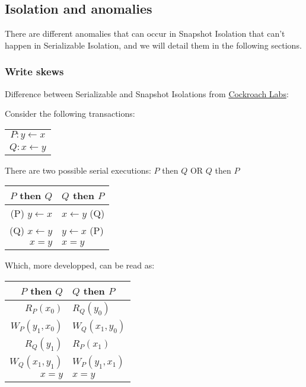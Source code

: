 \label{sec:isolation}
\subsection{Isolation and anomalies}

There are different anomalies that can occur in Snapshot Isolation that can't happen in Serializable Isolation, and we will detail them in the following sections.


\subsubsection{Write skews}


Difference between Serializable and Snapshot Isolations from \href{https://www.cockroachlabs.com/blog/what-write-skew-looks-like/}{Cockroach Labs}:

\cite{CRDB:write-skew}

Consider the following transactions:
\begin{table}[H]
  \centering
  \begin{tabular}{ c }
    $P:   y \gets x$\\
    $Q:   x \gets y$\\
  \end{tabular}
\end{table}


There are two possible serial executions: $P$ then $Q$ OR $Q$ then $P$
\begin{table}[H]
  \centering
  \begin{tabular}{ r | l }
    $P$ then $Q$ & $Q$ then $P$ \\
        \hline
    (P) $y \gets x$ & $x \gets y$ (Q) \\
    (Q) $x \gets y$ & $y \gets x$ (P) \\
    $x = y$ & $x = y$ \\
  \end{tabular}
\end{table}
Which, more developped, can be read as:
\begin{table}[H]
  \centering
  \begin{tabular}{ r | l }
    $P$ then $Q$ & $Q$ then $P$ \\
        \hline
    $R_P(x_0)$ &  $R_Q(y_0)$ \\
    $W_P(y_1, x_0)$ & $W_Q(x_1, y_0)$ \\
    $R_Q(y_1)$ &  $R_P(x_1)$ \\
    $W_Q(x_1, y_1)$ & $W_P(y_1, x_1)$ \\
    $x = y$ & $x = y$ \\
  \end{tabular}
\end{table}

